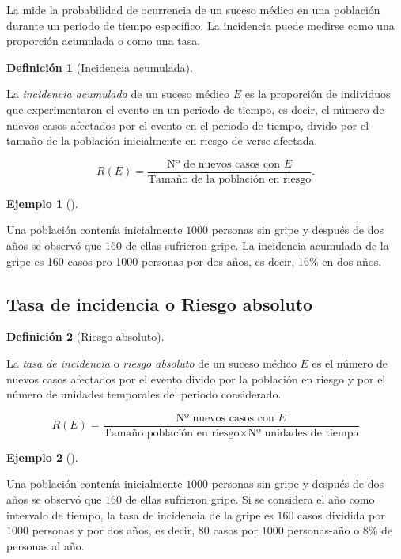 \documentclass[
  a4paper,
]{scrreport}
\theoremstyle{plain}
\theoremstyle{definition}
\newtheorem{example}{Ejemplo}[chapter]
\theoremstyle{definition}
\newtheorem{definition}{Definición}[chapter]
\theoremstyle{remark}
\begin{document}
La mide la probabilidad de ocurrencia de un suceso médico en una
población durante un periodo de tiempo específico. La incidencia puede
medirse como una proporción acumulada o como una tasa.

\begin{definition}[Incidencia
acumulada]\protect\hypertarget{def-incidencia-acumulada}{}\label{def-incidencia-acumulada}

La \emph{incidencia acumulada} de un suceso médico \(E\) es la
proporción de individuos que experimentaron el evento en un periodo de
tiempo, es decir, el número de nuevos casos afectados por el evento en
el periodo de tiempo, divido por el tamaño de la población inicialmente
en riesgo de verse afectada.

\[R(E)=\frac{\mbox{Nº de nuevos casos con $E$}}{\mbox{Tamaño de la población en riesgo}}.\]

\end{definition}

\begin{example}[]\protect\hypertarget{exm-incidencia-acumulada}{}\label{exm-incidencia-acumulada}

Una población contenía inicialmente \(1000\) personas sin gripe y
después de dos años se observó que \(160\) de ellas sufrieron gripe. La
incidencia acumulada de la gripe es 160 casos pro 1000 personas por dos
años, es decir, 16\% en dos años.

\end{example}

\subsection{Tasa de incidencia o Riesgo
absoluto}\label{tasa-de-incidencia-o-riesgo-absoluto}

\begin{definition}[Riesgo
absoluto]\protect\hypertarget{def-riesgo-absoluto}{}\label{def-riesgo-absoluto}

La \emph{tasa de incidencia} o \emph{riesgo absoluto} de un suceso
médico \(E\) es el número de nuevos casos afectados por el evento divido
por la población en riesgo y por el número de unidades temporales del
periodo considerado.

\[R(E)=\frac{\mbox{Nº nuevos casos con $E$}}{\mbox{Tamaño población en riesgo}\times \mbox{Nº unidades de tiempo}}\]

\end{definition}

\begin{example}[]\protect\hypertarget{exm-riesgo-absoluto}{}\label{exm-riesgo-absoluto}

Una población contenía inicialmente \(1000\) personas sin gripe y
después de dos años se observó que \(160\) de ellas sufrieron gripe. Si
se considera el año como intervalo de tiempo, la tasa de incidencia de
la gripe es \(160\) casos dividida por \(1000\) personas y por dos años,
es decir, \(80\) casos por \(1000\) personas-año o 8\% de personas al
año.

\end{example}
\end{document}
